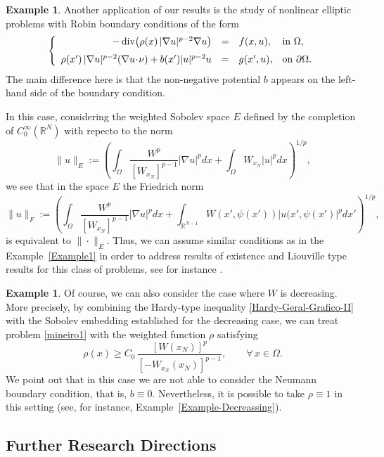 \documentclass[12pt]{amsart}
\theoremstyle{definition}
\newtheorem{example}[theorem]{Example}
\theoremstyle{plain}
\newcommand{\dint}{\int_{\Omega}}
\begin{document}
\begin{example}    
Another application of our results is the study of  nonlinear elliptic problems with Robin boundary conditions of the form
\begin{equation} \label{mineiro1}
\left\{
\begin{array}{rcll}
-\operatorname{div}\!\big(\rho(x)\,|\nabla u|^{p-2}\nabla u\big) &=& f(x,u), & \text{in } \Omega, \medskip\\
\rho(x')\,|\nabla u|^{p-2}(\nabla u\!\cdot\!\nu) + b(x')|u|^{p-2}u &=& g(x',u), & \text{on } \partial\Omega.
\end{array}
\right.
\end{equation}
The main difference here is that the non-negative potential $b$ appears on the left-hand side of the boundary condition. 

In this case, considering the weighted Sobolev space $E$ defined by the completion of $C_0^\infty(\mathbb{R}^N)$ with repecto to the norm 
$$
\|u\|_E:=\left(\dint \frac{W^p}{[W_{x_N}]^{p-1}} |\nabla u|^pdx+\dint W_{x_N}|u|^pdx\right)^{1/p},
$$
we see that in the space $E$ the Friedrich norm  
$$
    \|u\|_F:=\left(\dint \frac{W^p}{[W_{x_N}]^{p-1}}|\nabla u|^pdx+\int_{\mathbb{R}^{N-1}} W(x',\psi(x'))|u(x',\psi(x')|^pdx'\right)^{1/p},
$$
is equivalent to $\|\cdot\|_E$. Thus, we can assume similar conditions as in the Example~\ref{Example1} in order to address results of existence and Liouville type results for this class of problems, see for instance \cite{zbMATH05077864}.
\end{example}

\begin{example}
Of course, we can also consider  the case where $W$ is decreasing. More precisely, by combining the Hardy-type inequality \eqref{Hardy-Geral-Grafico-II} with the Sobolev embedding established for the decreasing case, we can treat problem \eqref{mineiro1}
with the weighted function $\rho$ satisfying
	$$
	\rho(x)\geq  C_0\,\frac{[W(x_N)]^p}{[-W_{x_N}(x_N)]^{p-1}}, \qquad \forall\, x \in \Omega.
	$$
    We point out that in this case we are not able to consider the Neumann boundary condition, that is, $b \equiv 0$. Nevertheless, it is possible to take $\rho \equiv 1$ in this setting (see, for instance, Example~\ref{Example-Decreassing}).
\end{example}

\subsection{Further Research Directions}
\end{document}
